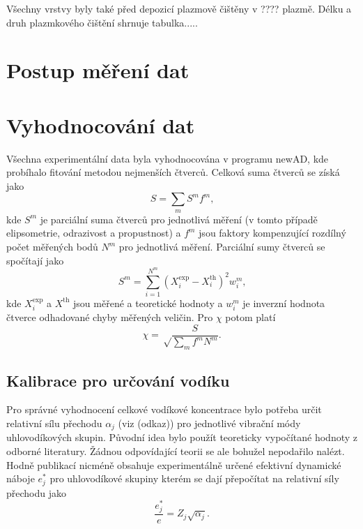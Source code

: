 Všechny vrstvy byly také před depozicí plazmově čištěny v ???? plazmě. Délku a druh plazmkového čištění shrnuje tabulka.....

\section{Postup měření dat}

\section{Vyhodnocování dat}
Všechna experimentální data byla vyhodnocována v programu newAD, kde probíhalo fitování metodou nejmenších čtverců. Celková suma čtverců se získá jako
%
\begin{equation} S = \sum_m S^m f^m \text{,}\end{equation}
%
kde $S^m$ je parciální suma čtverců pro jednotlivá měření (v tomto případě elipsometrie, odrazivost a propustnost) a $f^m$ jsou faktory kompenzující rozdílný počet měřených bodů $N^m$ pro jednotlivá měření. Parciální sumy čtverců se spočítají jako
%
\begin{equation} S^m = \sum_{i=1}^{N^m} (X_i^\mathrm{exp} - X_i^\mathrm{th})^2 w_i^m \text{,} \end{equation}
%
kde $X_i^\mathrm{exp}$ a $X^\mathrm{th}$ jsou měřené a teoretické hodnoty a $w_i^m$ je inverzní hodnota čtverce odhadované chyby měřených veličin. Pro $\chi$ potom platí \cite{Franta2011}
%
\begin{equation} \chi = \sqrt \frac{S}{\sum_m f^m N^m} \mathrm{.}\end{equation}


\subsection{Kalibrace pro určování vodíku}
Pro správné vyhodnocení celkové vodíkové koncentrace bylo potřeba určit relativní sílu přechodu $\alpha_j$ (viz (odkaz)) pro jednotlivé vibrační módy uhlovodíkových skupin. Původní idea bylo použít teoreticky vypočítané hodnoty z odborné literatury. Žádnou odpovídající teorii se ale bohužel nepodařilo nalézt. Hodně publikací nicméně obsahuje experimentálně určené efektivní dynamické náboje $e_j^*$ pro uhlovodíkové skupiny kterém se dají přepočítat na relativní síly přechodu jako \cite{sumrule2}
\begin{equation}
\frac{e_j^*}{e} = Z_j \sqrt{\alpha_j} \text{.}
\end{equation}

